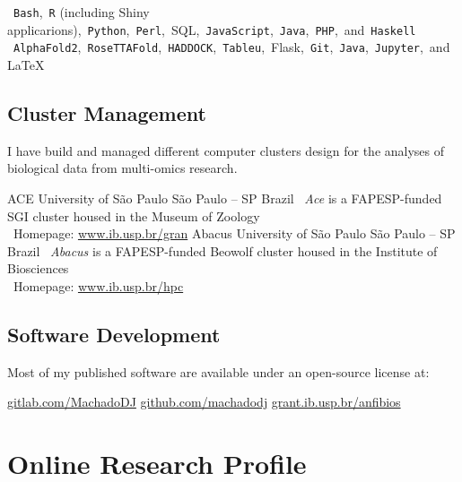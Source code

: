 \documentclass[11pt, letterpaper, sans]{moderncv}
\begin{document}
		{\small ~\texttt{Bash},~\texttt{R} (including Shiny applicarions),~\texttt{Python},~\texttt{Perl},~{SQL},~\texttt{JavaScript},~\texttt{Java},~\texttt{PHP},~and~\texttt{Haskell}}
        {\small ~\texttt{AlphaFold2},~\texttt{RoseTTAFold},~\texttt{HADDOCK},~\texttt{Tableu},~{Flask},~\texttt{Git},~\texttt{Java},~\texttt{Jupyter},~and~\LaTeX}

\subsection{Cluster Management}

I have build and managed different computer clusters design for the analyses of biological data from multi-omics research.

		{ACE}
		{University of São Paulo}
		{São Paulo -- SP}
		{Brazil}
		{
			\textbullet~\emph{Ace} is a FAPESP-funded SGI cluster housed in the Museum of Zoology\\
			\textbullet~Homepage: \href{https://www.ib.usp.br/grant/anfibios/researchHPC.html}{www.ib.usp.br/gran}
		}
		{Abacus}
		{University of São Paulo}
		{São Paulo -- SP}
		{Brazil}
		{
			\textbullet~\emph{Abacus} is a FAPESP-funded Beowolf cluster housed in the Institute of Biosciences\\
			\textbullet~Homepage: \href{https://www.ib.usp.br/hpc/}{www.ib.usp.br/hpc}
		}

\subsection{Software Development}

	\begin{flushleft}
		{Most of my published software are available under an open-source license at:}
	\end{flushleft}

		{\href{https://gitlab.com/MachadoDJ}{gitlab.com/MachadoDJ}}
		{\href{https://github.com/machadodj}{github.com/machadodj}}
		{\href{https://grant.ib.usp.br/anfibios/researchSoftware.html}{grant.ib.usp.br/anfibios}}

\section{Online Research Profile}

\end{document}

